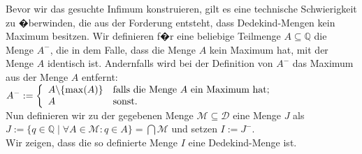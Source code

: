 \solution
Bevor wir das gesuchte Infimum konstruieren, gilt es eine technische Schwierigkeit zu �berwinden,
die aus der Forderung entsteht, dass Dedekind-Mengen kein Maximum besitzen.  Wir
definieren f�r eine beliebige Teilmenge $A \subseteq \mathbb{Q}$
die Menge $A^-$, die in dem Falle, dass die Menge $A$ kein Maximum hat, mit der Menge $A$ identisch ist.
Andernfalls wird bei der Definition von $A^-$ das Maximum aus der Menge $A$ entfernt:
\\[0.2cm]
\hspace*{1.3cm}
$A^- := \left\{
\begin{array}[c]{ll}
  A \backslash \{ \max(A) \} & \mbox{falls die Menge $A$ ein Maximum hat}; \\
  A                          & \mbox{sonst}.
\end{array}
\right.$
\\[0.2cm]
Nun definieren wir zu der gegebenen Menge $\mathcal{M} \subseteq \mathcal{D}$ eine Menge $J$ als
\\[0.2cm]
\hspace*{1.3cm}
$J := \{ q \in \mathbb{Q} \mid \forall A \in \mathcal{M}: q \in A \} = \bigcap \mathcal{M}$ 
\quad und setzen $I := J^-$. 
\\[0.2cm]
Wir zeigen, dass die so definierte Menge $I$ eine Dedekind-Menge ist.
